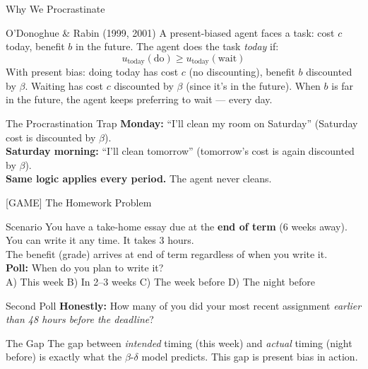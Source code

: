 \documentclass[aspectratio=169]{beamer}
\begin{document}
\begin{frame}{Why We Procrastinate}
\begin{block}{O'Donoghue \& Rabin (1999, 2001)}
A present-biased agent faces a task: cost $c$ today, benefit $b$ in the future. The agent does the task \textit{today} if:
\[
  u_{\text{today}}(\text{do}) \geq u_{\text{today}}(\text{wait})
\]
With present bias: doing today has cost $c$ (no discounting), benefit $b$ discounted by $\beta$. Waiting has cost $c$ discounted by $\beta$ (since it's in the future). When $b$ is far in the future, the agent keeps preferring to wait --- every day.
\end{block}
\begin{exampleblock}{The Procrastination Trap}
\textbf{Monday:} ``I'll clean my room on Saturday'' (Saturday cost is discounted by $\beta$).\\
\textbf{Saturday morning:} ``I'll clean tomorrow'' (tomorrow's cost is again discounted by $\beta$).\\
\textbf{Same logic applies every period.} The agent never cleans.
\end{exampleblock}
\end{frame}

\begin{frame}{[GAME] The Homework Problem}
\begin{alertblock}{Scenario}
You have a take-home essay due at the \textbf{end of term} (6 weeks away). You can write it any time. It takes 3 hours.\\[0.4em]
The benefit (grade) arrives at end of term regardless of when you write it.\\[0.4em]
\textbf{Poll:} When do you plan to write it?\\[0.2em]
\quad A) This week \quad B) In 2--3 weeks \quad C) The week before \quad D) The night before
\end{alertblock}
\pause
\begin{block}{Second Poll}
\textbf{Honestly:} How many of you did your most recent assignment \textit{earlier than 48 hours before the deadline}?
\end{block}
\pause
\begin{exampleblock}{The Gap}
The gap between \textit{intended} timing (this week) and \textit{actual} timing (night before) is exactly what the $\beta$-$\delta$ model predicts. This gap is \alert{present bias in action}.
\end{exampleblock}
\end{frame}
\end{document}
